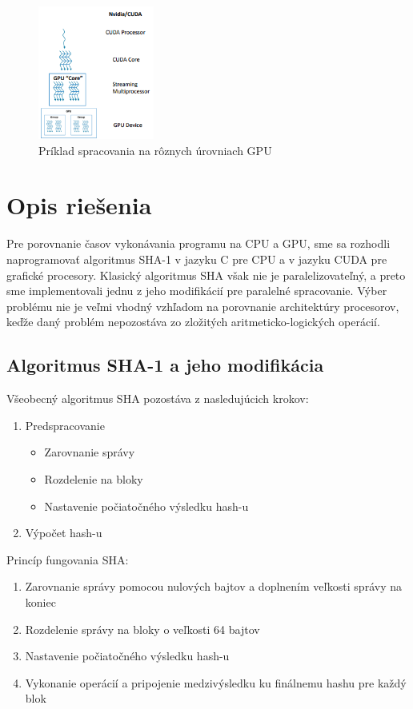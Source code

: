 \documentclass[conference]{IEEEtran}
\begin{document}
\begin{figure}[!h]
\centering
\includegraphics[width=1.5in]{img/stream}
\caption{Príklad spracovania na rôznych úrovniach GPU}
\end{figure}

\section{Opis riešenia}

Pre porovnanie časov vykonávania programu na CPU a GPU, sme sa rozhodli naprogramovať algoritmus SHA-1 v jazyku C pre CPU a v jazyku CUDA pre grafické procesory. Klasický algoritmus SHA však nie je paralelizovateľný, a preto sme implementovali jednu z jeho modifikácií pre paralelné spracovanie. Výber problému nie je veľmi vhodný vzhľadom na porovnanie architektúry procesorov, keďže daný problém nepozostáva zo zložitých aritmeticko-logických operácií.

\subsection{Algoritmus SHA-1 a jeho modifikácia}

Všeobecný algoritmus SHA pozostáva z nasledujúcich krokov:

\begin{enumerate}
	\item{Predspracovanie}
	\begin{itemize}
		\item{Zarovnanie správy}
		\item{Rozdelenie na bloky}
		\item{Nastavenie počiatočného výsledku hash-u}\\
	\end{itemize}
	\item{Výpočet hash-u}
\end{enumerate}

Princíp fungovania SHA: 
\begin{enumerate}
	\item{Zarovnanie správy pomocou nulových bajtov a doplnením veľkosti správy na koniec}
	\item{Rozdelenie správy na bloky o veľkosti 64 bajtov}
	\item{Nastavenie počiatočného výsledku hash-u}
	\item{Vykonanie operácií a pripojenie medzivýsledku ku finálnemu hashu pre každý blok}
\end{enumerate}
\end{document}
